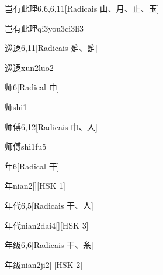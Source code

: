 \begin{entry}{岂有此理}{6,6,6,11}[Radicais ⼭、⽉、⽌、⽟]
  \begin{phonetics}{岂有此理}{qi3you3ci3li3}
  \end{phonetics}
\end{entry}

\begin{entry}{巡逻}{6,11}[Radicais ⾡、⾡]
  \begin{phonetics}{巡逻}{xun2luo2}
  \end{phonetics}
\end{entry}

\begin{entry}{师}{6}[Radical ⼱]
  \begin{phonetics}{师}{shi1}
  \end{phonetics}
\end{entry}

\begin{entry}{师傅}{6,12}[Radicais ⼱、⼈]
  \begin{phonetics}{师傅}{shi1fu5}
  \end{phonetics}
\end{entry}

\begin{entry}{年}{6}[Radical ⼲]
  \begin{phonetics}{年}{nian2}[][HSK 1]
  \end{phonetics}
\end{entry}

\begin{entry}{年代}{6,5}[Radicais ⼲、⼈]
  \begin{phonetics}{年代}{nian2dai4}[][HSK 3]
  \end{phonetics}
\end{entry}

\begin{entry}{年级}{6,6}[Radicais ⼲、⽷]
  \begin{phonetics}{年级}{nian2ji2}[][HSK 2]
  \end{phonetics}
\end{entry}

